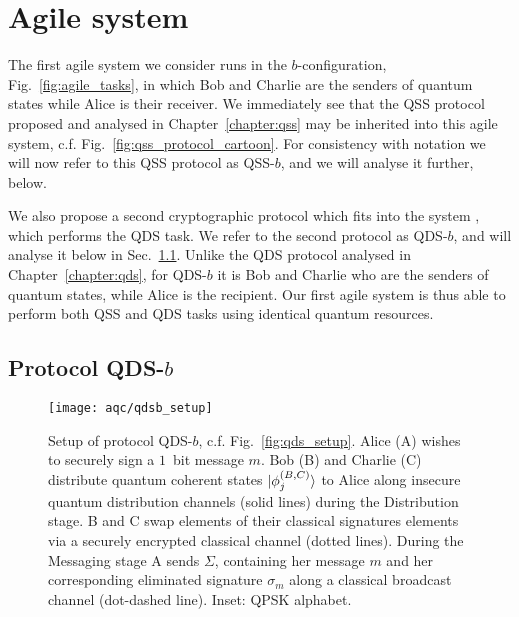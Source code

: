 \section{Agile system \systemB}\label{sec:aqc_systemb}
The first agile system we consider runs in the $b$-configuration, Fig.~\ref{fig:agile_tasks}, in which Bob and Charlie are the senders of quantum states while Alice is their receiver. We immediately see that the QSS protocol proposed and analysed in Chapter~\ref{chapter:qss} may be inherited into this agile system, c.f. Fig.~\ref{fig:qss_protocol_cartoon}. For consistency with notation we will now refer to this QSS protocol as QSS-$b$, and we will analyse it further, below. 

We also propose a second cryptographic protocol which fits into the system \systemB, which performs the QDS task. We refer to the second protocol as QDS-$b$, and will analyse it below in Sec.~\ref{sec:aqc_qdsb}. Unlike the QDS protocol analysed in Chapter~\ref{chapter:qds}, for QDS-$b$ it is Bob and Charlie who are the senders of quantum states, while Alice is the recipient. %
Our first agile system \systemB \; is thus able to perform both QSS and QDS tasks using identical quantum resources. %

\subsection{Protocol QDS-$b$}\label{sec:aqc_qdsb}


\begin{figure}[htp]
\captionsetup{width=\linewidth}
\centering
\texttt{[image: aqc/qdsb\_setup]}
\caption{\label{fig:qdsb_setup} Setup of protocol QDS-$b$, c.f. Fig.~\ref{fig:qds_setup}. Alice (A) wishes to securely sign a $1$~bit message $m$. Bob (B) and Charlie (C) distribute quantum coherent states $\ket{\phi_j^{\left(B, C\right)}}$ to Alice along insecure quantum distribution channels (solid lines) during the Distribution stage. B and C swap elements of their classical signatures elements via a securely encrypted classical channel (dotted lines). During the Messaging stage A sends $\Sigma$, containing her message $m$ and her corresponding eliminated signature $\sigma_m$ along a classical broadcast channel (dot-dashed line). Inset: QPSK alphabet.}
\end{figure}

